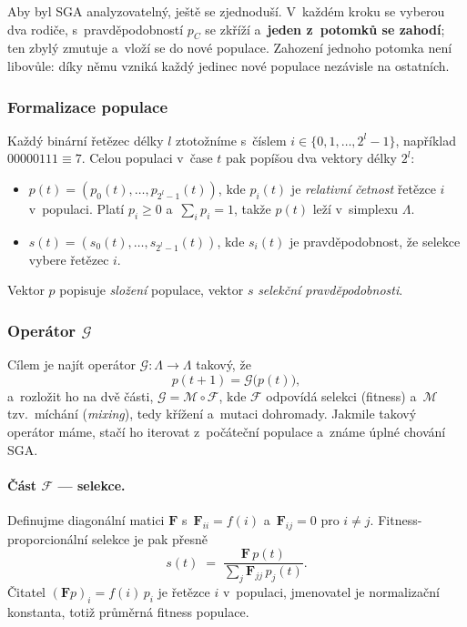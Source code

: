 \documentclass[11pt,a4paper]{article}
\theoremstyle{definition}
\begin{document}
Aby byl SGA analyzovatelný, ještě se zjednoduší. V~každém kroku se vyberou dva rodiče,
s~pravděpodobností $p_C$ se zkříží a~\textbf{jeden z~potomků se zahodí}; ten zbylý
zmutuje a~vloží se do nové populace. Zahození jednoho potomka není libovůle: díky němu
vzniká každý jedinec nové populace nezávisle na ostatních.

\subsubsection{Formalizace populace}
\label{ssec:vose}

Každý binární řetězec délky $l$ ztotožníme s~číslem
$i \in \{0,1,\dots,2^l-1\}$, například $00000111 \equiv 7$. Celou populaci v~čase $t$
pak popíšou dva vektory délky $2^l$:

\begin{defbox}
\begin{itemize}
\item $p(t) = (p_0(t),\dots,p_{2^l-1}(t))$, kde $p_i(t)$ je \emph{relativní
  četnost} řetězce $i$ v~populaci. Platí $p_i \ge 0$ a~$\sum_i p_i = 1$, takže
  $p(t)$ leží v~simplexu $\Lambda$.
\item $s(t) = (s_0(t),\dots,s_{2^l-1}(t))$, kde $s_i(t)$ je pravděpodobnost,
  že selekce vybere řetězec $i$.
\end{itemize}
Vektor $p$ popisuje \emph{složení} populace, vektor $s$ \emph{selekční
pravděpodobnosti}.
\end{defbox}

\subsubsection{Operátor $\mathcal{G}$}

Cílem je najít operátor $\mathcal{G}: \Lambda \to \Lambda$ takový, že
\[
p(t+1) = \mathcal{G}\big(p(t)\big),
\]
a~rozložit ho na dvě části, $\mathcal{G} = \mathcal{M} \circ \mathcal{F}$,
kde $\mathcal{F}$ odpovídá selekci (fitness) a~$\mathcal{M}$ tzv.\ míchání
(\emph{mixing}), tedy křížení a~mutaci dohromady. Jakmile takový operátor máme,
stačí ho iterovat z~počáteční populace a~známe úplné chování SGA.

\paragraph{Část $\mathcal{F}$ --- selekce.} Definujme diagonální matici
$\mathbf{F}$ s~$\mathbf{F}_{ii} = f(i)$ a~$\mathbf{F}_{ij} = 0$ pro $i \ne j$.
Fitness-proporcionální selekce je pak přesně
\[
s(t) \;=\; \frac{\mathbf{F}\,p(t)}{\sum_j \mathbf{F}_{jj}\,p_j(t)} .
\]
Čitatel $(\mathbf{F}p)_i = f(i)\,p_i$ je  řetězce $i$ v~populaci,
jmenovatel je normalizační konstanta, totiž průměrná fitness populace.
\end{document}
